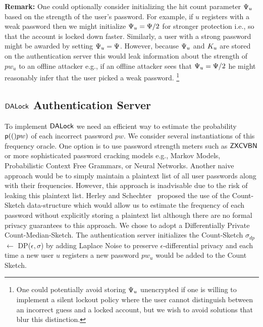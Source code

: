{\noindent \bf Remark:} One could optionally consider initializing the hit count parameter $\Psi_{u}$ based on the strength of the user's password. For example, if $u$ registers with a weak password then we might initialize $\Psi_{u} = \Psi/2$ for stronger protection i.e., so that the account is locked down faster. Similarly, a user with a strong password might be awarded by setting $\Psi_{u} = \Psi$. However, because $\Psi_{u}$ and $K_{u}$ are stored on the authentication server this would leak information about the strength of $pw_u$ to an offline attacker e.g., if an offline attacker sees that $\Psi_{u} = \Psi/2$ he might reasonably infer that the user picked a weak password. \footnote{One could potentially avoid storing $\Psi_{u}$ unencrypted if one is willing to implement a silent lockout policy where the user cannot distinguish between an incorrect guess and a locked account, but we wish to avoid solutions that blur this distinction.}  



\subsection{$\mathsf{DALock}$ Authentication Server} %
To implement $\mathsf{DALock}$ we need an efficient way to estimate the probability $\textsf{p}(()pw)$ of each incorrect password $pw$. We consider several instantiations of this frequency oracle. One option is to use password strength meters such as $\mathsf{ZXCVBN}$ or more sophisticated password cracking models e.g., Markov Models, Probabilistic Context Free Grammars, or Neural Networks. Another naive approach would be to simply maintain a plaintext list of all user passwords along with their frequencies. However, this approach is inadvisable due to the risk of leaking this plaintext list. Herley and Schechter~\cite{HTS:SchHerMit10} proposed the use of the Count-Sketch data-structure which would allow us to estimate the frequency of each password without explicitly storing a plaintext list although there are no formal privacy guarantees to this approach. We chose to adopt a Differentially Private Count-Median-Sketch. The authentication server initializes the Count-Sketch $\sigma_{dp}$ $\leftarrow$  DP($\epsilon, \sigma$) by adding Laplace Noise to preserve $\epsilon$-differential privacy and each time a new user $u$ registers a new password  $pw_u$ would be added to the Count Sketch.

